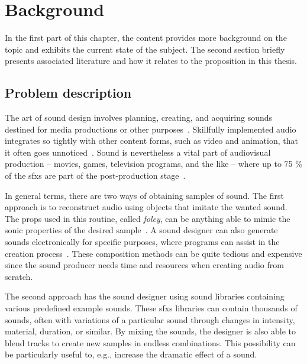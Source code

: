 \bgroup{}

\chapter{Background}\label{cha:background}
In the first part of this chapter, the content provides more background on the topic and exhibits the current state of the subject. The second section briefly presents associated literature and how it relates to the proposition in this thesis.

\section{Problem description}
The art of sound design involves planning, creating, and acquiring sounds destined for media productions or other purposes~\cite[1]{rep:knowledge_and_content-based_audio_retrieval_using_wordnet}. Skillfully implemented audio integrates so tightly with other content forms, such as video and animation, that it often goes unnoticed~\cite[1]{rep:an_approach_for_structuring_sound_sample_libraries_using_ontology}. Sound is nevertheless a vital part of audiovisual production – movies, games, television programs, and the like – where up to 75 \% of the \glspl{sfx} are part of the post-production stage~\cite[1]{rep:extending_tagging_ontologies_with_domain_specific_knowledge}.

In general terms, there are two ways of obtaining samples of sound. The first approach is to reconstruct audio using objects that imitate the wanted sound. The props used in this routine, called \emph{foley}, can be anything able to mimic the sonic properties of the desired sample~\cite[1]{rep:unsupervised_taxonomy_of_sound_effects}. A sound designer can also generate sounds electronically for specific purposes, where programs can assist in the creation process~\cite{rep:machine_learning_and_sound_design}. These composition methods can be quite tedious and expensive since the sound producer needs time and resources when creating audio from scratch.

The second approach has the sound designer using sound libraries containing various predefined example sounds. These \glspl{sfx} libraries can contain thousands of sounds, often with variations of a particular sound through changes in intensity, material, duration, or similar. By mixing the sounds, the designer is also able to blend tracks to create new samples in endless combinations. This possibility can be particularly useful to, e.g., increase the dramatic effect of a sound.~\cite[1]{rep:an_approach_for_structuring_sound_sample_libraries_using_ontology}~\cite[1]{rep:knowledge_and_content-based_audio_retrieval_using_wordnet}

